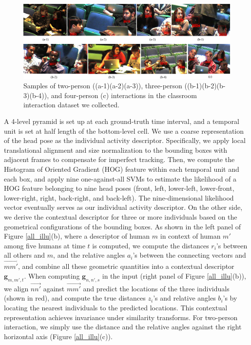 \documentclass[10pt,twocolumn,letterpaper]{article}
\begin{document}
\begin{figure}[t]
\begin{center}
\includegraphics[scale=1.2]{dataset.png}
\end{center}
\caption{Samples of two-person ((a-1)(a-2)(a-3)), three-person ((b-1)(b-2)(b-3)(b-4)), and four-person (c) interactions in the classroom interaction dataset we collected.}
\label{dataset}
\end{figure}



A 4-level pyramid is set up at each ground-truth time interval, and a temporal unit is set at half length of the bottom-level cell. We use a coarse representation of the head pose as the individual activity descriptor. Specifically, we apply local translational alignment and size normalization to the bounding boxes with adjacent frames to compensate for imperfect tracking. Then, we compute the Histogram of Oriented Gradient (HOG) feature within each temporal unit and each box, and apply nine one-against-all SVMs to estimate the likelihood of a HOG feature belonging to nine head poses (front, left, lower-left, lower-front, lower-right, right, back-right, and back-left). The nine-dimensional likelihood vector eventually serves as our individual activity descriptor. On the other side, we derive the contextual descriptor for three or more individuals based on the geometrical configurations of the bounding boxes. As shown in the left panel of Figure \ref{all_illu}(b), where a descriptor of human $m$ in context of human $m'$ among five humans at time $t$ is computed, we compute the distances $r_{i}$'s between all others and $m$, and the relative angles $a_{i}$'s between the connecting vectors and $\overrightarrow{mm'}$, and combine all these geometric quantities into a contextual descriptor $\mathbf{g}_{m,m',t}$. When computing $\mathbf{g}_{n,n',s}$ in the input (right panel of Figure \ref{all_illu}(b)), we align $\overrightarrow{nn'}$ against $\overrightarrow{mm'}$ and predict the locations of the three individuals (shown in red), and compute the true distances $z_{i}$'s and relative angles $b_{i}$'s by locating the nearest individuals to the predicted locations. This contextual representation achieves invariance under similarity transforms. For two-person interaction, we simply use the distance and the relative angles against the right horizontal axis (Figure \ref{all_illu}(c)). 
\end{document}
